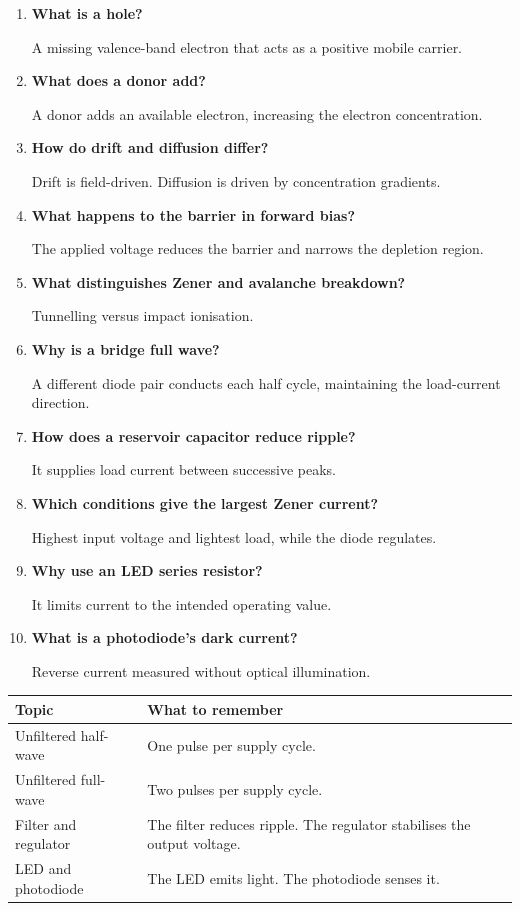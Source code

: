 \documentclass[12pt,a4paper]{article}
\newcommand{\Q}[1]{\textbf{#1}\par\noindent\ignorespaces}
\begin{document}
\begin{tcolorbox}[exambox, title={Frequently Asked / Viva Questions}]
\begin{enumerate}[topsep=0pt, label=\textbf{Q\arabic*.}, itemsep=5pt]
  \item \Q{What is a hole?} A missing valence-band electron that acts as a positive mobile carrier.
  \item \Q{What does a donor add?} A donor adds an available electron, increasing the electron concentration.
  \item \Q{How do drift and diffusion differ?} Drift is field-driven. Diffusion is driven by concentration gradients.
  \item \Q{What happens to the barrier in forward bias?} The applied voltage reduces the barrier and narrows the depletion region.
  \item \Q{What distinguishes Zener and avalanche breakdown?} Tunnelling versus impact ionisation.
  \item \Q{Why is a bridge full wave?} A different diode pair conducts each half cycle, maintaining the load-current direction.
  \item \Q{How does a reservoir capacitor reduce ripple?} It supplies load current between successive peaks.
  \item \Q{Which conditions give the largest Zener current?} Highest input voltage and lightest load, while the diode regulates.
  \item \Q{Why use an LED series resistor?} It limits current to the intended operating value.
  \item \Q{What is a photodiode's dark current?} Reverse current measured without optical illumination.
\end{enumerate}
\end{tcolorbox}

\begin{tcolorbox}[tikzbox, title={Summary Reference}]
\begin{tabularx}{\linewidth}{|B{4.0cm}|Y|}\hline
Topic & \textbf{What to remember} \\ \hline
Unfiltered half-wave & One pulse per supply cycle. \\ \hline
Unfiltered full-wave & Two pulses per supply cycle. \\ \hline
Filter and regulator & The filter reduces ripple. The regulator stabilises the output voltage. \\ \hline
LED and photodiode & The LED emits light. The photodiode senses it. \\ \hline
\end{tabularx}
\end{tcolorbox}
\end{document}
